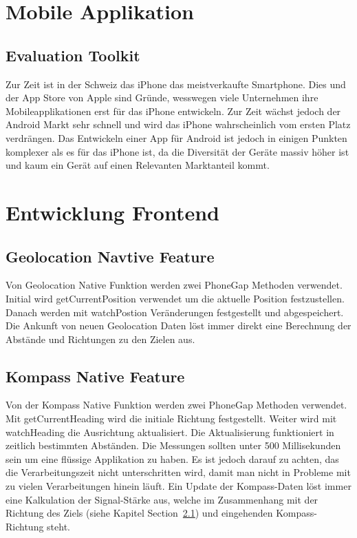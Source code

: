
\newpage
\section{Mobile Applikation} %
\label{sec:Mobile Applikation}

\subsection{Evaluation Toolkit} %
\label{sub:Evaluation Toolkit}
Zur Zeit ist in der Schweiz das iPhone das meistverkaufte Smartphone. Dies und der App Store von Apple sind Gründe, wesswegen viele Unternehmen ihre Mobileapplikationen erst für das iPhone entwickeln. Zur Zeit wächst jedoch der Android Markt sehr schnell und wird das iPhone wahrscheinlich vom ersten Platz verdrängen. Das Entwickeln einer App für Android ist jedoch in einigen Punkten komplexer als es für das iPhone ist, da die Diversität der Geräte massiv höher ist und kaum ein Gerät auf einen Relevanten Marktanteil kommt.

\section{Entwicklung Frontend} %
\label{sec:entwicklung_frontend}

\subsection{Geolocation Navtive Feature} %
\label{sub:geolocation_native_feature}
Von Geolocation Native Funktion werden zwei PhoneGap Methoden verwendet. Initial wird getCurrentPosition verwendet um die aktuelle Position festzustellen. Danach werden mit watchPostion Veränderungen festgestellt und abgespeichert. Die Ankunft von neuen Geolocation Daten löst immer direkt eine Berechnung der Abstände und Richtungen zu den Zielen aus.

\subsection{Kompass Native Feature} %
\label{sub:kompass_native_feature}
Von der Kompass Native Funktion werden zwei PhoneGap Methoden verwendet. Mit getCurrentHeading wird die initiale Richtung festgestellt. Weiter wird mit watchHeading die Ausrichtung aktualisiert. Die Aktualisierung funktioniert in zeitlich bestimmten Abständen. Die Messungen sollten unter 500 Millisekunden sein um eine flüssige Applikation zu haben. Es ist jedoch darauf zu achten, das die Verarbeitungszeit nicht unterschritten wird, damit man nicht in Probleme mit zu vielen Verarbeitungen hinein läuft. Ein Update der Kompass-Daten löst immer eine Kalkulation der Signal-Stärke aus, welche im Zusammenhang mit der Richtung des Ziels (siehe Kapitel  Section~\ref{sub:geolocation_native_feature}) und eingehenden Kompass-Richtung steht.

